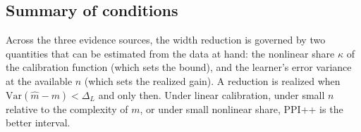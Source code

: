 \subsection{Summary of conditions}

Across the three evidence sources, the width reduction is governed by two quantities that can be estimated from the data at hand: the nonlinear share $\kappa$ of the calibration function (which sets the bound), and the learner's error variance at the available $n$ (which sets the realized gain). A reduction is realized when $\mathrm{Var}(\hat m-m)<\Delta_L$ and only then. Under linear calibration, under small $n$ relative to the complexity of $m$, or under small nonlinear share, PPI++ is the better interval.
